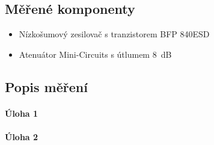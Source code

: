 \documentclass[11pt,a4paper]{article}
\begin{document}
\subsection*{Měřené komponenty}
\begin{itemize}
    \item Nízkošumový zesilovač s tranzistorem BFP 840ESD
    \item Atenuátor Mini-Circuits s útlumem 8~dB
\end{itemize}

\subsection*{Popis měření}
\lipsum[1]

\paragraph*{Úloha 1} \lipsum[5]


\paragraph*{Úloha 2} \lipsum[3]

\end{document}
